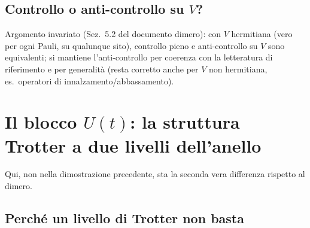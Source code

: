 \documentclass[11pt,a4paper]{article}
\begin{document}
\subsection{Controllo o anti-controllo su $V$?}

Argomento invariato (Sez.~5.2 del documento dimero): con $V$ hermitiana (vero per ogni Pauli, su
qualunque sito), controllo pieno e anti-controllo su $V$ sono equivalenti; si mantiene
l'anti-controllo per coerenza con la letteratura di riferimento e per generalità (resta corretto
anche per $V$ non hermitiana, es.\ operatori di innalzamento/abbassamento).

\section{Il blocco $U(t)$: la struttura Trotter a due livelli dell'anello}
\label{sec:trotter}

Qui, non nella dimostrazione precedente, sta la seconda vera differenza rispetto al dimero.

\subsection{Perché un livello di Trotter non basta}
\end{document}
